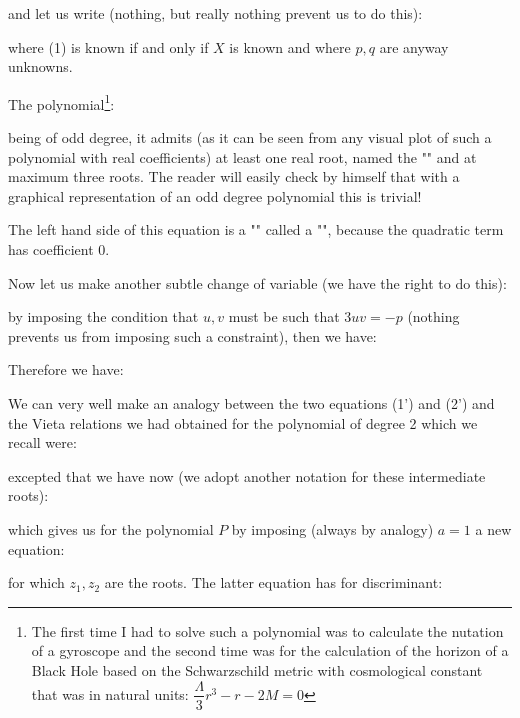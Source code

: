 	and let us write (nothing, but really nothing prevent us to do this):
	
	where (1) is known if and only if $X$ is known and where $p,q$ are anyway unknowns.

	The polynomial\footnote{The first time I had to solve such a polynomial was to calculate the nutation of a gyroscope and the second time was for the calculation of the horizon of a Black Hole based on the Schwarzschild metric with cosmological constant that was in natural units: $\dfrac{\Lambda}{3}r^3-r-2M=0$}:
	
	being of odd degree, it admits (as it can be seen from any visual plot of such a polynomial with real coefficients) at least one real root, named the "" and at maximum three roots. The reader will easily check by himself that with a graphical representation of an odd degree polynomial this is trivial!
	
	The left hand side of this equation is a "" called a "", because the quadratic term has coefficient $0$.
	
	Now let us make another subtle change of variable (we have the right to do this):
	
	by imposing the condition that $u, v$ must be such that $3uv=-p$ (nothing prevents us from imposing such a constraint), then we have:
	
	Therefore we have:
	
	We can very well make an analogy between the two equations (1') and (2') and the Vieta relations we had obtained for the polynomial of degree 2 which we recall were:
	
	excepted that we have now (we adopt another notation for these intermediate roots):
	
	which gives us for the polynomial $P$ by imposing (always by analogy) $a=1$ a new equation:
	
	for which $z_1,z_2$ are the roots.
	The latter equation has for discriminant:
	
